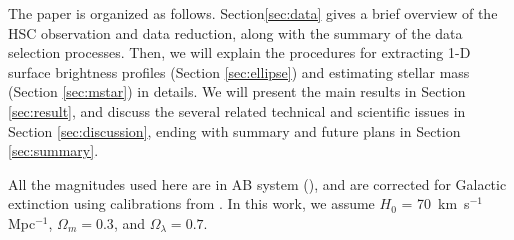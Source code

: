 \documentclass[a4paper,fleqn,usenatbib]{mnras}
\begin{document}
    The paper is organized as follows. Section\ref{sec:data} gives a brief overview of 
    the HSC observation and data reduction, along with the summary of the data selection
    processes.  
    Then, we will explain the procedures for extracting 1-D surface brightness profiles 
    (Section \ref{sec:ellipse}) and estimating stellar mass (Section \ref{sec:mstar}) in
    details.   
    We will present the main results in Section \ref{sec:result}, and discuss the several 
    related technical and scientific issues in Section \ref{sec:discussion}, ending with
    summary and future plans in Section \ref{sec:summary}.

    All the magnitudes used here are in AB system (\citealt{Oke1983}), and are corrected 
    for Galactic extinction using calibrations from \citet{Schlafly11}.
    In this work, we assume $H_0$ = 70~km~s$^{-1}$ Mpc$^{-1}$, ${\Omega}_m=0.3$, 
    and ${\Omega}_{\lambda}=0.7$. 
    
\end{document}

